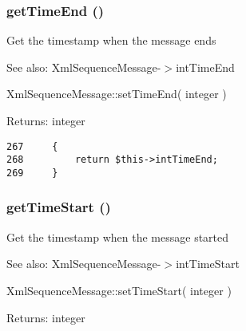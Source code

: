 \hypertarget{class_xml_sequence_message_3a9eaea81ee7f74f90108c9b3c5d60da}{
\subsubsection[{getTimeEnd}]{\setlength{\rightskip}{0pt plus 5cm}getTimeEnd ()}}
\label{class_xml_sequence_message_3a9eaea81ee7f74f90108c9b3c5d60da}


Get the timestamp when the message ends

\begin{Desc}
\item[See also:]XmlSequenceMessage-$>$intTimeEnd 

XmlSequenceMessage::setTimeEnd( integer ) \end{Desc}
\begin{Desc}
\item[Returns:]integer \end{Desc}


\begin{Code}\begin{verbatim}267     {
268         return $this->intTimeEnd;
269     }
\end{verbatim}
\end{Code}


\hypertarget{class_xml_sequence_message_bb950915c967cab83e55f46db3d44169}{
\subsubsection[{getTimeStart}]{\setlength{\rightskip}{0pt plus 5cm}getTimeStart ()}}
\label{class_xml_sequence_message_bb950915c967cab83e55f46db3d44169}


Get the timestamp when the message started

\begin{Desc}
\item[See also:]XmlSequenceMessage-$>$intTimeStart 

XmlSequenceMessage::setTimeStart( integer ) \end{Desc}
\begin{Desc}
\item[Returns:]integer \end{Desc}


